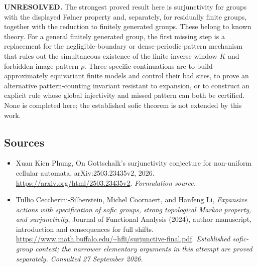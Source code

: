 \documentclass[11pt]{article}
\begin{document}
\textbf{UNRESOLVED.} The strongest proved result here is surjunctivity
for groups with the displayed F\o lner property and, separately, for
residually finite groups, together with the reduction to finitely generated
groups. These belong to known theory. For a general finitely generated
group, the first missing step is a replacement for the negligible-boundary
or dense-periodic-pattern mechanism that rules out the simultaneous
existence of the finite inverse window $K$ and forbidden image pattern $p$.
Three specific continuations are to build approximately equivariant finite
models and control their bad sites, to prove an alternative pattern-counting
invariant resistant to expansion, or to construct an explicit rule whose
global injectivity and missed pattern can both be certified. None is
completed here; the established sofic theorem is not extended by this work.


\subsection{Sources}
\begin{itemize}
\item[S1]Xuan Kien Phung, On Gottschalk's surjunctivity conjecture for non-uniform cellular automata, arXiv:2503.23435v2, 2026.
\url{https://arxiv.org/html/2503.23435v2}.
\textit{Formulation source.}
\item[E1]Tullio Ceccherini-Silberstein, Michel Coornaert, and Hanfeng Li,
\emph{Expansive actions with specification of sofic groups, strong topological
Markov property, and surjunctivity}, Journal of Functional Analysis (2024),
author manuscript, introduction and consequences for full shifts.
\url{https://www.math.buffalo.edu/~hfli/surjunctive-final.pdf}.
\textit{Established sofic-group context; the narrower elementary arguments
in this attempt are proved separately. Consulted 27 September 2026.}
\end{itemize}
\end{document}
